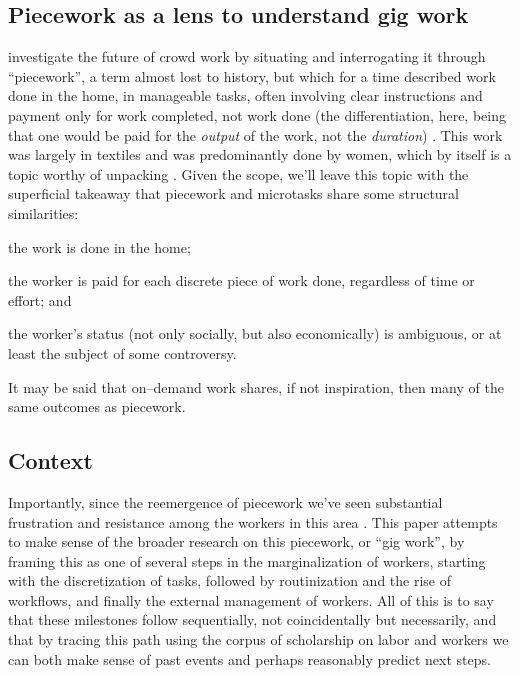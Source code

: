 \documentclass{sigchi}
\begin{document}



\subsection{Piecework as a lens to understand gig work}
\citeauthor{crowdworkFuture}
investigate the future of crowd work by
situating and interrogating it through ``piecework'',
a term almost lost to history, but which for a time described
work done in the home,
in manageable tasks,
often involving clear instructions
and payment only for work completed, not work done
(the differentiation, here, being that
one would be paid for the \textit{output} of the work,
not the \textit{duration})
\cite{crowdworkFuture}.
This work was largely in textiles and was predominantly done by women,
which by itself is a topic worthy of unpacking
\cite{scott1975women}.
Given the scope, 
we'll leave this topic with the superficial takeaway that
piecework and microtasks share some structural similarities:
\begin{inlinelist}
\item the work is done in the home;
\item the worker is paid for each discrete piece of work done, regardless of time or effort; and
\item the worker's status
(not only socially, but also economically)
is ambiguous, or at least the subject of some controversy.
\end{inlinelist}
It may be said that
on--demand work shares, if not inspiration, then many of the same outcomes as piecework.


\subsection{Context}
Importantly, since the reemergence of piecework we've seen substantial frustration
and resistance among the workers in this area
\cite{uberAlgorithm,turkopticon,dynamo}.
This paper attempts to make sense of the broader research on this piecework,
or ``gig work'', by framing this as one of several steps in the marginalization of workers,
starting with the discretization of tasks,
followed by routinization and the rise of workflows,
and finally the external management of workers.
All of this is to say that these milestones follow sequentially,
not coincidentally but necessarily,
and that by tracing this path using the corpus of scholarship on labor and workers
we can both make sense of past events and perhaps reasonably predict next steps.
\end{document}
